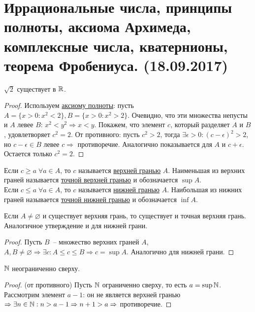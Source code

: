 \section{Иррациональные числа, принципы полноты, аксиома Архимеда, комплексные числа, кватернионы, теорема Фробениуса. (18.09.2017)}

\begin{claim}
	$\sqrt{2}$ существует в $\mathbb{R}$.
\end{claim}
\begin{proof}
	Используем \hyperref[axiom_completeness]{аксиому полноты}: пусть $A = \{x > 0 : x^2 < 2\}, B = \{x > 0 : x^2 > 2\}$. Очевидно, что эти множества непусты и $A$ левее $B$: $x^2 < y^2 \Rightarrow x < y$. Покажем, что элемент $c$, который разделяет $A$ и $B$, удовлетворяет $c^2 = 2$. От противного: пусть $c^2 > 2$, тогда $\exists \epsilon > 0: (c - \epsilon)^2 > 2$, но $c - \epsilon \in B$ левее $c \Rightarrow$ противоречие. Аналогично показывается для $A$ и $c + \epsilon$. Остается только $c^2 = 2$.
\end{proof}

\begin{defin}
	Если $c \ge a\; \forall a \in A$, то $c$ называется \underline{верхней гранью} $A$. Наименьшая из верхних граней называется \underline{точной верхней гранью} и обозначается $\sup{A}$.\\
	Если $c \le a\; \forall a \in A$, то $c$ называется \underline{нижней гранью} $A$. Наибольшая из нижних граней называется \underline{точной нижней гранью} и обозначается $\inf{A}$.
\end{defin}

\begin{theo}
	Если $A \neq \varnothing$ и существует верхняя грань, то существует и точная верхняя грань. Аналогичное утверждение и для нижней грани.
\end{theo}
\begin{proof}
	Пусть $B$~-- множество верхних граней $A$, $A,B \neq \varnothing \Rightarrow \exists c: A \le c \le B \Rightarrow c = \sup{A}$. Аналогично для нижней грани.
\end{proof}

\label{axiom_Archimedes}\begin{cor}
	$\mathbb{N}$ неограниченно сверху.
\end{cor}
\begin{proof}
	(от противного) Пусть $\mathbb{N}$ ограниченно сверху, то есть $a = \sup{\mathbb{N}}$. Рассмотрим элемент $a-1$: он не является верхней гранью $\Rightarrow \exists n \in \mathbb{N}: n > a-1 \Rightarrow n+1 > a \Rightarrow$ противоречие.
\end{proof}

